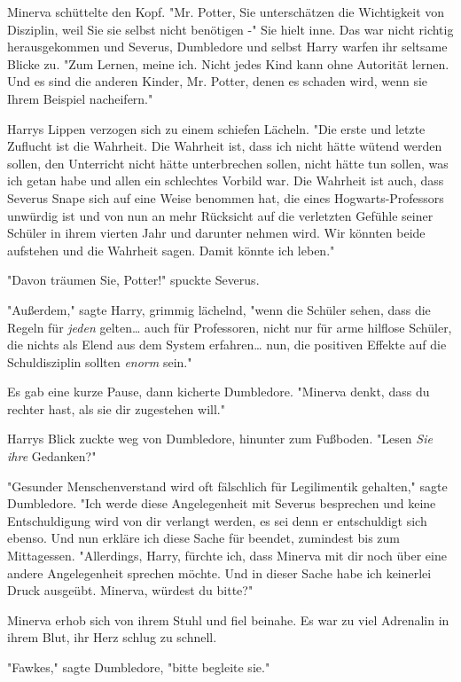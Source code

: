 {Minerva schüttelte den Kopf. "Mr. Potter, Sie unterschätzen die Wichtigkeit von Disziplin, weil Sie sie selbst nicht benötigen -" Sie hielt inne. Das war nicht richtig herausgekommen und Severus, Dumbledore und selbst Harry warfen ihr seltsame Blicke zu. "Zum Lernen, meine ich. Nicht jedes Kind kann ohne Autorität lernen. Und es sind die anderen Kinder, Mr. Potter, denen es schaden wird, wenn sie Ihrem Beispiel nacheifern."

Harrys Lippen verzogen sich zu einem schiefen Lächeln. "Die erste und letzte Zuflucht ist die Wahrheit. Die Wahrheit ist, dass ich nicht hätte wütend werden sollen, den Unterricht nicht hätte unterbrechen sollen, nicht hätte tun sollen, was ich getan habe und allen ein schlechtes Vorbild war. Die Wahrheit ist auch, dass Severus Snape sich auf eine Weise benommen hat, die eines Hogwarts-Professors unwürdig ist und von nun an mehr Rücksicht auf die verletzten Gefühle seiner Schüler in ihrem vierten Jahr und darunter nehmen wird. Wir könnten beide aufstehen und die Wahrheit sagen. Damit könnte ich leben."

"Davon träumen Sie, Potter!" spuckte Severus.

"Außerdem," sagte Harry, grimmig lächelnd, "wenn die Schüler sehen, dass die Regeln für \emph{jeden} gelten… auch für Professoren, nicht nur für arme hilflose Schüler, die nichts als Elend aus dem System erfahren… nun, die positiven Effekte auf die Schuldisziplin sollten \emph{enorm} sein."

Es gab eine kurze Pause, dann kicherte Dumbledore. "Minerva denkt, dass du rechter hast, als sie dir zugestehen will."

Harrys Blick zuckte weg von Dumbledore, hinunter zum Fußboden. "Lesen \emph{Sie ihre} Gedanken?"

"Gesunder Menschenverstand wird oft fälschlich für Legilimentik gehalten," sagte Dumbledore. "Ich werde diese Angelegenheit mit Severus besprechen und keine Entschuldigung wird von dir verlangt werden, es sei denn er entschuldigt sich ebenso. Und nun erkläre ich diese Sache für beendet, zumindest bis zum Mittagessen. "Allerdings, Harry, fürchte ich, dass Minerva mit dir noch über eine andere Angelegenheit sprechen möchte. Und in dieser Sache habe ich keinerlei Druck ausgeübt. Minerva, würdest du bitte?"

Minerva erhob sich von ihrem Stuhl und fiel beinahe. Es war zu viel Adrenalin in ihrem Blut, ihr Herz schlug zu schnell.

"Fawkes," sagte Dumbledore, "bitte begleite sie."

}

